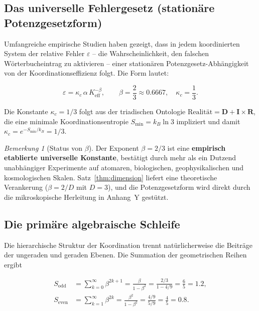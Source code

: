 \documentclass[12pt,a4paper]{article}
\theoremstyle{remark}
\newtheorem{remark}[theorem]{Bemerkung}
\begin{document}
	\subsection{Das universelle Fehlergesetz (stationäre Potenzgesetzform)}
	
	Umfangreiche empirische Studien \cite{AppendixL, AppendixFerra} haben gezeigt,
	dass in jedem koordinierten System der relative Fehler \(\varepsilon\) -- die
	Wahrscheinlichkeit, den falschen Wörterbucheintrag zu aktivieren -- einer
	stationären Potenzgesetz-Abhängigkeit von der Koordinationseffizienz folgt.
	Die Form lautet:
	
	\begin{equation}
		\boxed{\varepsilon = \kappa_c \, \alpha \, K_{\mathrm{eff}}^{-\beta}, \qquad
			\beta = \frac{2}{3} \approx 0.6667,\quad \kappa_c = \frac{1}{3}}.
		\label{eq:error-law-corrected}
	\end{equation}
	
	Die Konstante \(\kappa_c = 1/3\) folgt aus der triadischen Ontologie
	\(\text{Realität} = \mathbf{D} + \mathbf{I} \times \mathbf{R}\), die eine
	minimale Koordinationsentropie \(S_{\min} = k_B \ln 3\) impliziert und damit
	\(\kappa_c = e^{-S_{\min}/k_B} = 1/3\).
	
	\begin{remark}[Status von \(\beta\)]
		Der Exponent \(\beta = 2/3\) ist eine \textbf{empirisch etablierte universelle
			Konstante}, bestätigt durch mehr als ein Dutzend unabhängiger Experimente
		auf atomaren, biologischen, geophysikalischen und kosmologischen Skalen.
		Satz~\ref{thm:dimension} liefert eine theoretische Verankerung
		(\(\beta = 2/D\) mit \(D=3\)), und die Potenzgesetzform wird direkt durch
		die mikroskopische Herleitung in Anhang~Y gestützt.
	\end{remark}
	
	\subsection{Die primäre algebraische Schleife}
	\label{sec:algebraic-loop}
	
	Die hierarchische Struktur der Koordination trennt natürlicherweise die Beiträge
	der ungeraden und geraden Ebenen. Die Summation der geometrischen Reihen ergibt
	
	\begin{align}
		S_{\mathrm{odd}} &= \sum_{k=0}^{\infty} \beta^{2k+1} = \frac{\beta}{1-\beta^{2}}
		= \frac{2/3}{1 - 4/9} = \frac{6}{5} = 1.2, \label{eq:sodd}\\
		S_{\mathrm{even}} &= \sum_{k=1}^{\infty} \beta^{2k} = \frac{\beta^{2}}{1-\beta^{2}}
		= \frac{4/9}{5/9} = \frac{4}{5} = 0.8. \label{eq:seven}
	\end{align}
	
\end{document}
